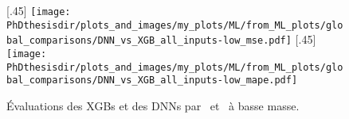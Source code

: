 \begin{figure}[h]
\centering

[.45\textwidth]
{\texttt{[image: \\PhDthesisdir/plots\_and\_images/my\_plots/ML/from\_ML\_plots/global\_comparisons/DNN\_vs\_XGB\_all\_inputs-low\_mse.pdf]}\vspace{-\baselineskip}}
\hfill
{}[.45\textwidth]
{\texttt{[image: \\PhDthesisdir/plots\_and\_images/my\_plots/ML/from\_ML\_plots/global\_comparisons/DNN\_vs\_XGB\_all\_inputs-low\_mape.pdf]}\vspace{-\baselineskip}}

\caption{Évaluations des XGBs et des DNNs par \LossMSE\ et \LossMAPE\ à basse masse.}
\label{fig-DNN_vs_XGB-mse_mape-low}
\end{figure}
